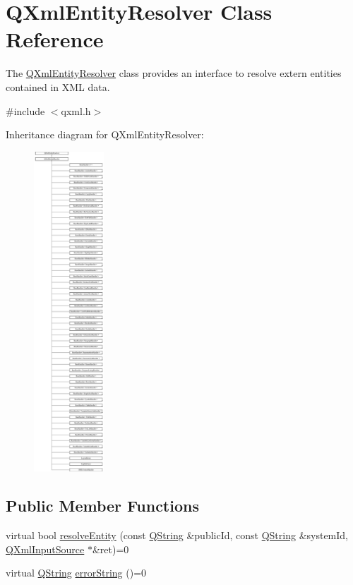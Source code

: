\hypertarget{class_q_xml_entity_resolver}{}\section{Q\+Xml\+Entity\+Resolver Class Reference}
\label{class_q_xml_entity_resolver}


The \mbox{\hyperlink{class_q_xml_entity_resolver}{Q\+Xml\+Entity\+Resolver}} class provides an interface to resolve extern entities contained in X\+ML data.  




{\ttfamily \#include $<$qxml.\+h$>$}

Inheritance diagram for Q\+Xml\+Entity\+Resolver\+:\begin{figure}[H]
\begin{center}
\leavevmode
\includegraphics[height=12.000000cm]{class_q_xml_entity_resolver}
\end{center}
\end{figure}
\subsection*{Public Member Functions}
\begin{DoxyCompactItemize}
\item 
virtual bool \mbox{\hyperlink{class_q_xml_entity_resolver_a4b0b6141c016eb3f7e37361f4ce13966}{resolve\+Entity}} (const \mbox{\hyperlink{class_q_string}{Q\+String}} \&public\+Id, const \mbox{\hyperlink{class_q_string}{Q\+String}} \&system\+Id, \mbox{\hyperlink{class_q_xml_input_source}{Q\+Xml\+Input\+Source}} $\ast$\&ret)=0
\item 
virtual \mbox{\hyperlink{class_q_string}{Q\+String}} \mbox{\hyperlink{class_q_xml_entity_resolver_a3f190a7cd80a8faa3df903f963709370}{error\+String}} ()=0
\end{DoxyCompactItemize}


